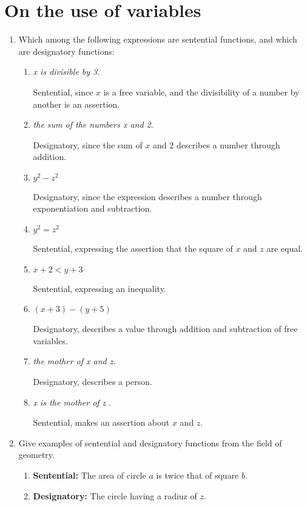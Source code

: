 \section{On the use of variables}
\begin{enumerate}
\item Which among the following expressions are sentential functions,
  and which are designatory functions:
  \begin{enumerate}
  \item \emph{x is divisible by 3}.

    Sentential, since $x$ is a free variable, and the divisibility of
    a number by another is an assertion.

  \item \emph{the sum of the numbers x and 2}.

    Designatory, since the sum of $x$ and 2 describes a number through
    addition.

  \item $y^2-z^2$

    Designatory, since the expression describes a number through
    exponentiation and subtraction.

  \item $y^2=z^2$

    Sentential, expressing the assertion that the square of $x$ and
    $z$ are equal.

  \item $x+2<y+3$

    Sentential, expressing an inequality.

  \item $(x+3)-(y+5)$

    Designatory, describes a value through addition and subtraction of
    free variables.

  \item \emph{the mother of x and z}.

    Designatory, describes a person.

  \item \emph{x is the mother of z} \hspace{1em}.

    Sentential, makes an assertion about $x$ and $z$.

  \end{enumerate}

\item Give examples of sentential and designatory functions from the
  field of geometry.
  \begin{enumerate}
  \item \textbf{Sentential:} The area of circle $a$ is twice that of
    square $b$.
  \item \textbf{Designatory:} The circle having a radiuz of $z$.
  \end{enumerate}



\end{enumerate}
